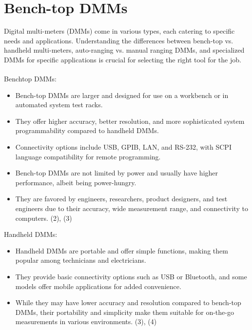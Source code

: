 \documentclass[12pt]{article}
\begin{document}
	\section{Bench-top DMMs}
	Digital multi-meters (DMMs) come in various types, each catering to specific needs and applications. Understanding the differences between bench-top vs. handheld multi-meters, auto-ranging vs. manual ranging DMMs, and specialized DMMs for specific applications is crucial for selecting the right tool for the job. \\ \\
	Benchtop DMMs:
	\begin{itemize}
		\item Bench-top DMMs are larger and designed for use on a workbench or in automated system test racks.
		\item They offer higher accuracy, better resolution, and more sophisticated system programmability compared to handheld DMMs.
		\item Connectivity options include USB, GPIB, LAN, and RS-232, with SCPI language compatibility for remote programming.
		\item Bench-top DMMs are not limited by power and usually have higher performance, albeit being power-hungry.
		\item They are favored by engineers, researchers, product designers, and test engineers due to their accuracy, wide measurement range, and connectivity to computers. (2), (3)
	\end{itemize}
	Handheld DMMs:
	\begin{itemize}
		\item Handheld DMMs are portable and offer simple functions, making them popular among technicians and electricians.
		\item They provide basic connectivity options such as USB or Bluetooth, and some models offer mobile applications for added convenience.
		\item While they may have lower accuracy and resolution compared to bench-top DMMs, their portability and simplicity make them suitable for on-the-go measurements in various environments. (3), (4)
	\end{itemize}
	
\end{document}
